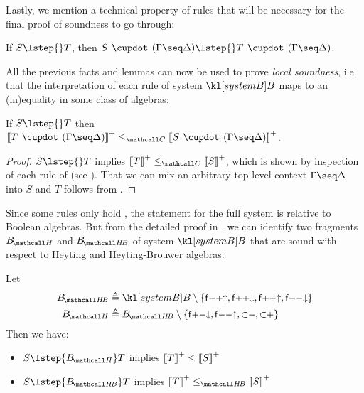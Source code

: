 Lastly, we mention a technical property of rules that will be necessary for the
final proof of soundness to go through:

\begin{fact}
  If $S \lstep{} T$, then $S \mix (\Gamma \seq \Delta) \lstep{} T \mix (\Gamma \seq \Delta)$.
\end{fact}

All the previous facts and lemmas can now be used to prove \emph{local
soundness}, i.e. that the interpretation of each rule of system $\sysB$ maps to
an (in)equality in some class of algebras:

\begin{lemma}
  
  If $S \lstep{} T$ then $\psint{T \mix (\Gamma \seq \Delta)} \sementC \psint{S
  \mix (\Gamma \seq \Delta)}$.
\end{lemma}
\begin{proof}
  $S \lstep{} T$ implies $\psint{T} \sementC \psint{S}$, which is shown by
  inspection of each rule of  (see ).
  That we can mix an arbitrary top-level context $\Gamma \seq \Delta$ into $S$
  and $T$ follows from .
\end{proof}

Since some rules only hold , the statement for the full system is
relative to Boolean algebras. But from the detailed proof in
, we can identify two fragments $\sysBH$ and
$\sysBHB$ of system $\sysB$ that are sound with respect to Heyting and
Heyting-Brouwer algebras:

\begin{corollary}\label{cor:lsoundness}
  Let
  \begin{align*}
    \sysBHB &\defeq \sysB \setminus \{\rsf{f{-}{+}{\ua}}, \rsf{f{+}{+}{\da}}, \rsf{f{+}{-}{\ua}}, \rsf{f{-}{-}{\da}}\} \\
    \sysBH &\defeq \sysBHB \setminus \{\rsf{f{+}{-}{\da}, \rsf{f{-}{-}{\ua}, \rsf{{\lsub}{-}}, \rsf{{\lsub}{+}}}}\}
  \end{align*}
  Then we have:
  \begin{itemize}
    \item $S \lstep{\sysBH} T$ implies $\left\llbracket T \right\rrbracket^+ \leq \left\llbracket S \right\rrbracket^+$
    \item $S \lstep{\sysBHB} T$ implies $\psint{T} \sementHB \psint{S}$
  \end{itemize}
\end{corollary}

